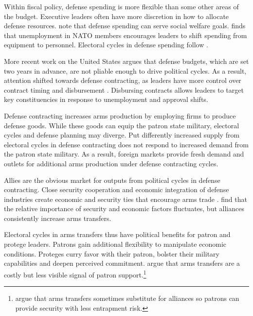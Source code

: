 \documentclass[12pt]{article}
\begin{document}
Within fiscal policy, defense spending is more flexible than some other areas of the budget.
Executive leaders often have more discretion in how to allocate defense resources.
\citet{WhittenWilliams2011} note that defense spending can serve social welfare goals. 
\citet{Becker2021} finds that unemployment in NATO members encourages leaders to shift spending from equipment to personnel.
Electoral cycles in defense spending follow \citep{Tufte1978, Mintz1988}.


More recent work on the United States argues that defense budgets, which are set two years in advance, are not pliable enough to drive political cycles.
As a result, attention shifted towards defense contracting, as leaders have more control over contract timing and disbursement \citep{Mayer1995, DerouenHeo2000}.
Disbursing contracts allows leaders to target key constituencies in response to unemployment and approval shifts.


Defense contracting increases arms production by employing firms to produce defense goods. 
While these goods can equip the patron state military, electoral cycles and defense planning may diverge.
Put differently increased supply from electoral cycles in defense contracting does not respond to increased demand from the patron state military. 
As a result, foreign markets provide fresh demand and outlets for additional arms production under defense contracting cycles. 


Allies are the obvious market for outputs from political cycles in defense contracting.
Close security cooperation and economic integration of defense industries create economic and security ties that encourage arms trade \citep{Bitzinger1994}. 
\citet{Thurneretal2019} find that the relative importance of security and economic factors fluctuates, but alliances consistently increase arms transfers.






Electoral cycles in arms transfers thus have political benefits for patron and protege leaders.
Patrons gain additional flexibility to manipulate economic conditions.
Proteges curry favor with their patron, bolster their military capabilities and deepen perceived commitment. 
\citet{McManusYarhi-Milo2017} argue that arms transfers are a costly but less visible signal of patron support.\footnote{\citet{Yarhi-Miloetal2016} argue that arms transfers sometimes substitute for alliances so patrons can provide security with less entrapment risk.}
\end{document}
